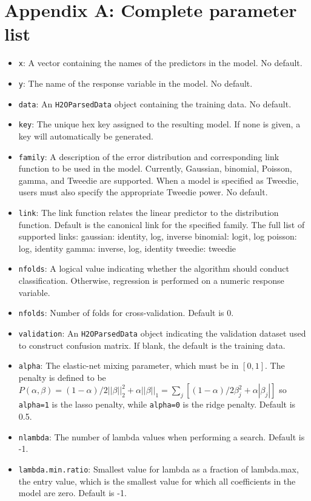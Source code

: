 \documentclass[11pt]{article}
\begin{document}
\section{Appendix A: Complete parameter list}
\begin{itemize}
\item \texttt{x}: A vector containing the names of the predictors in the model. No default.
\item \texttt{y}: The name of the response variable in the model. No default.
\item \texttt{data}: An \texttt{H2OParsedData} object containing the training data. No default.
\item \texttt{key}: The unique hex key assigned to the resulting model. If none is given, a key will automatically be generated.
\item \texttt{family}: A description of the error distribution and corresponding link function to be used in the model. Currently, Gaussian, binomial, Poisson, gamma, and Tweedie are supported. When a model is specified as Tweedie, users must also specify the appropriate Tweedie power. No default.
\item \texttt{link}: The link function relates the linear predictor to the distribution function. Default is the canonical link for the specified family. The full list of supported links: 
	gaussian: identity, log, inverse 
	binomial: logit, log 
	poisson: log, identity
	gamma: inverse, log, identity
	tweedie: tweedie 
\item \texttt{nfolds}: A logical value indicating whether the algorithm should conduct classification. Otherwise, regression is performed on a numeric response variable.
\item \texttt{nfolds}: Number of folds for cross-validation. Default is 0.
\item \texttt{validation}: An \texttt{H2OParsedData} object indicating the validation dataset used to construct confusion matrix. If  blank, the default is the training data.
\item \texttt{alpha}: The elastic-net mixing parameter, which must be in $[0,1]$. The penalty is defined to be $P(\alpha,\beta) = (1-\alpha)/2||\beta||_2^2 + \alpha||\beta||_1 = \sum_j [(1-\alpha)/2 \beta_j^2 + \alpha|\beta_j|] $ so \texttt{alpha=1} is the lasso penalty, while \texttt{alpha=0} is the ridge penalty. Default is 0.5.
\item \texttt{nlambda}: The number of lambda values when performing a search. Default is -1.
\item \texttt{lambda.min.ratio}: Smallest value for lambda as a fraction of lambda.max, the entry value, which is the smallest value for which all coefficients in the model are zero. Default is -1.

\end{itemize}
\end{document}
